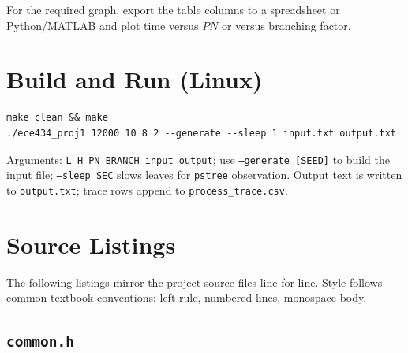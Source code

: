 \documentclass[11pt,a4paper]{article}
\begin{document}
For the required graph, export the table columns to a spreadsheet or Python/MATLAB and plot time versus $PN$ or versus branching factor.

\section{Build and Run (Linux)}
\begin{lstlisting}[style=textbookmake, numbers=none, frame=shadowbox, caption={Typical commands}]
make clean && make
./ece434_proj1 12000 10 8 2 --generate --sleep 1 input.txt output.txt
\end{lstlisting}
Arguments: \texttt{L H PN BRANCH input output}; use \texttt{--generate [SEED]} to build the input file; \texttt{--sleep SEC} slows leaves for \texttt{pstree} observation. Output text is written to \texttt{output.txt}; trace rows append to \texttt{process_trace.csv}.

\section{Source Listings}
The following listings mirror the project source files line-for-line. Style follows common textbook conventions: left rule, numbered lines, monospace body.

\subsection{\texttt{common.h}}
\end{document}
